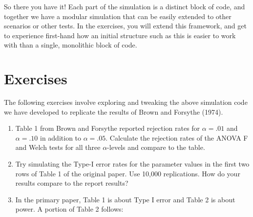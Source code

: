 \documentclass[
]{book}
\begin{document}
So there you have it! Each part of the simulation is a distinct block of code, and together we have a modular simulation that can be easily extended to other scenarios or other tests.
In the exercises, you will extend this framework, and get to experience first-hand how an initial structure such as this is easier to work with than a single, monolithic block of code.

\section{Exercises}\label{exAnovaExercises}

The following exercises involve exploring and tweaking the above simulation code we have developed to replicate the results of Brown and Forsythe (1974).

\begin{enumerate}
\def\labelenumi{\arabic{enumi}.}
\item
  Table 1 from Brown and Forsythe reported rejection rates for \(\alpha = .01\) and \(\alpha = .10\) in addition to \(\alpha = .05\). Calculate the rejection rates of the ANOVA F and Welch tests for all three \(\alpha\)-levels and compare to the table.
\item
  Try simulating the Type-I error rates for the parameter values in the first two rows of Table 1 of the original paper. Use 10,000 replications. How do your results compare to the report results?
\item
  In the primary paper, Table 1 is about Type I error and Table 2 is about power. A portion of Table 2 follows:
\end{enumerate}
\end{document}
